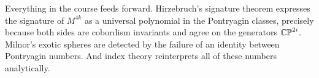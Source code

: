 \begin{remark}
Everything in the course feeds forward. Hirzebruch's signature theorem expresses
the signature of $M^{4k}$ as a universal polynomial in the Pontryagin classes,
precisely because both sides are cobordism invariants and agree on the
generators $\mathbb{CP}^{2i}$. Milnor's exotic spheres are detected by the failure of an
identity between Pontryagin numbers. And index theory reinterprets all of these
numbers analytically.
\end{remark}
